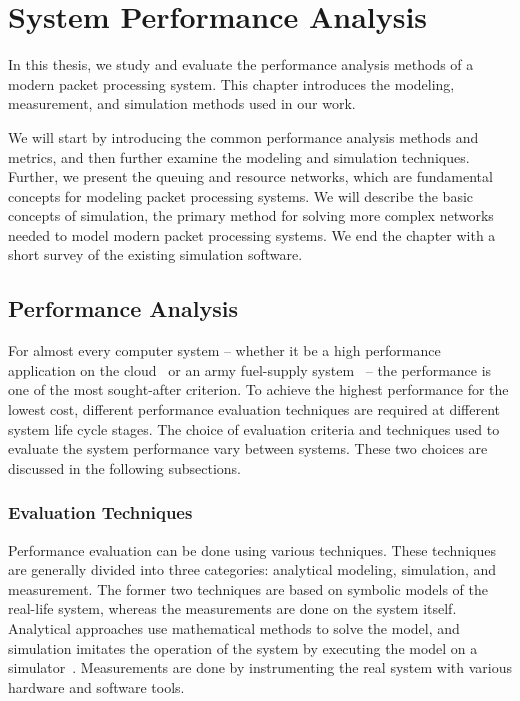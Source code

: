 \chapter{System Performance Analysis}
\label{chapter:system-performance-analysis}
In this thesis, we study and evaluate the performance analysis methods of a modern packet processing system. This chapter introduces the modeling, measurement, and simulation methods used in our work.

We will start by introducing the common performance analysis methods and metrics, and then further examine the modeling and simulation techniques. Further, we present the queuing and resource networks, which are fundamental concepts for modeling packet processing systems. We will describe the basic concepts of simulation, the primary method for solving more complex networks needed to model modern packet processing systems. We end the chapter with a short survey of the existing simulation software.

\section{Performance Analysis}
For almost every computer system -- whether it be a high performance application on the cloud~\cite{jackson:2010:HPCOC} or an army fuel-supply system~\cite{sabuncuoglu:2005:TAS} -- the performance is one of the most sought-after criterion. To achieve the highest performance for the lowest cost, different performance evaluation techniques are required at different system life cycle stages. The choice of evaluation criteria and techniques used to evaluate the system performance vary between systems. These two choices are discussed in the following subsections.~\cite{jain:1991:AOCSPA}

\subsection{Evaluation Techniques}
Performance evaluation can be done using various techniques. These techniques are generally divided into three categories: analytical modeling, simulation, and measurement. The former two techniques are based on symbolic models of the real-life system, whereas the measurements are done on the system itself. Analytical approaches use mathematical methods to solve the model, and simulation imitates the operation of the system by executing the model on a simulator~\cite{Banks:2010:DES}. Measurements are done by instrumenting the real system with various hardware and software tools.~\cite{jain:1991:AOCSPA}

